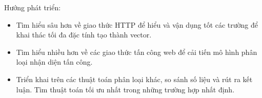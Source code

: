 \documentclass[../main-report.tex]{subfiles}
\begin{document}
Hướng phát triển:

\begin{itemize}
\item Tìm hiểu sâu hơn về giao thức HTTP để hiểu và vận dụng tốt các trường để khai thác tối đa đặc tính tạo thành vector.
\item Tìm hiểu nhiều hơn về các giao thức tấn công web để cải tiến mô hình phân loại nhận diện tấn công.
\item Triển khai trên các thuật toán phân loại khác, so sánh số liệu và rút ra kết luận. Tìm thuật toán tối ưu nhất trong những trường hợp nhất định.
\end{itemize}
\end{document}
